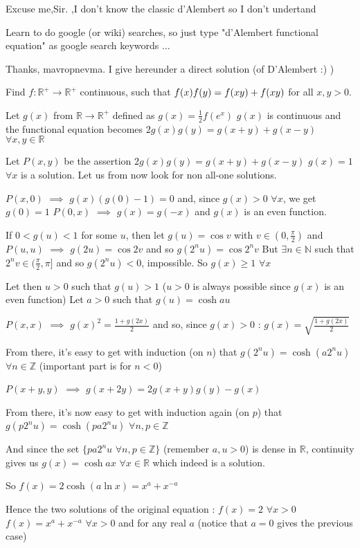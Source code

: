 \begin{solution}
	Excuse me,Sir. ,I don't know the classic d'Alembert so I don't undertand
\end{solution}



\begin{solution}
	Learn to do google (or wiki) searches, so just type "d'Alembert functional equation" as google search keywords ...
\end{solution}



\begin{solution}
	Thanks, mavropnevma.
I give hereunder a direct solution (of D'Alembert :) )
\begin{tcolorbox}Find $f: \mathbb{R}^+ \to \mathbb{R}^+$ continuous, such that $f(x)f(y)=f(xy)+f(x\/y)$ for all $x,y>0$.\end{tcolorbox}
Let $g(x)$ from $\mathbb R\to\mathbb R^+$ defined as $g(x)=\frac 12f(e^x)$
$g(x)$ is continuous and the functional equation becomes $2g(x)g(y)=g(x+y)+g(x-y)$ $\forall x,y\in\mathbb R$

Let $P(x,y)$ be the assertion $2g(x)g(y)=g(x+y)+g(x-y)$
$g(x)=1$ $\forall x$ is a solution. Let us from now look for non all-one solutions.

$P(x,0)$ $\implies$ $g(x)(g(0)-1)=0$ and, since $g(x)>0$ $\forall x$, we get $g(0)=1$
$P(0,x)$ $\implies$ $g(x)=g(-x)$ and $g(x)$ is an even function. 

If $0<g(u)<1$ for some $u$, then let $g(u)=\cos v$ with $v\in(0,\frac{\pi}2)$ and $P(u,u)$ $\implies$ $g(2u)=\cos 2v$ and so $g(2^nu)=\cos 2^nv$
But $\exists n\in\mathbb N$ such that $2^nv\in(\frac{\pi} 2,\pi]$ and so $g(2^nu)<0$, impossible.
So $g(x)\ge 1$ $\forall x$

Let then $u>0$ such that $g(u)>1$ ($u>0$ is always possible since $g(x)$ is an even function)
Let $a>0$ such that $g(u)=\cosh au$

$P(x,x)$ $\implies$ $g(x)^2=\frac{1+g(2x)}2$ and so, since $g(x)>0$ : $g(x)=\sqrt{\frac{1+g(2x)}2}$

From there, it's easy to get with induction (on $n$) that $g(2^{n}u)=\cosh (a2^{n}u)$ $\forall n\in\mathbb Z$ (important part is for $n<0$)

$P(x+y,y)$ $\implies$ $g(x+2y)=2g(x+y)g(y)-g(x)$

From there, it's now easy to get with induction again (on $p$) that $g(p2^nu)=\cosh (pa2^{n}u)$ $\forall n,p\in\mathbb Z$

And since the set $\{pa2^{n}u$ $\forall n,p\in\mathbb Z\}$ (remember $a,u>0$) is dense in $\mathbb R$, continuity gives us $g(x)=\cosh ax$ $\forall x\in\mathbb R$ which indeed is a solution.

So $f(x)=2\cosh (a\ln x)=x^a+x^{-a}$

Hence the two solutions of the original equation :
$f(x)=2$ $\forall x>0$
$f(x)=x^a+x^{-a}$ $\forall x>0$ and for any real $a$ (notice that $a=0$ gives the previous case)
\end{solution}
